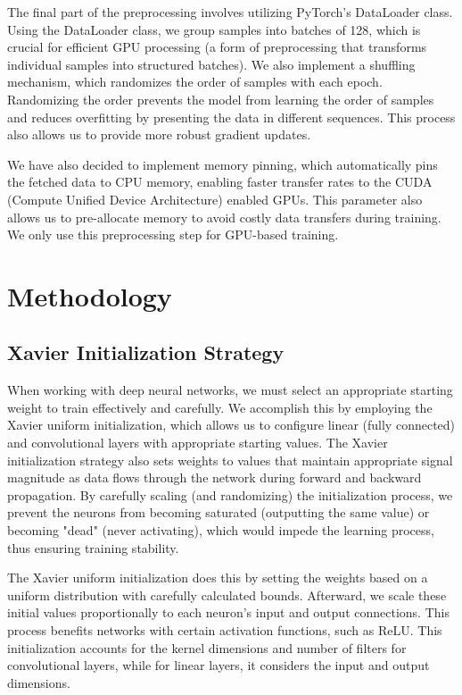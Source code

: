 \documentclass[12pt]{article}
\begin{document}
The final part of the preprocessing involves utilizing PyTorch's DataLoader class. Using the DataLoader class, we group samples into batches of 128, which is crucial for efficient GPU processing (a form of preprocessing that transforms individual samples into structured batches). We also implement a shuffling mechanism, which randomizes the order of samples with each epoch. Randomizing the order prevents the model from learning the order of samples and reduces overfitting by presenting the data in different sequences. This process also allows us to provide more robust gradient updates.

We have also decided to implement memory pinning, which automatically pins the fetched data to CPU memory, enabling faster transfer rates to the CUDA (Compute Unified Device Architecture) enabled GPUs. This parameter also allows us to pre-allocate memory to avoid costly data transfers during training. We only use this preprocessing step for GPU-based training.

\section*{Methodology}

\subsection*{Xavier Initialization Strategy}

When working with deep neural networks, we must select an appropriate starting weight to train effectively and carefully. We accomplish this by employing the Xavier uniform initialization, which allows us to configure linear (fully connected) and convolutional layers with appropriate starting values. The Xavier initialization strategy also sets weights to values that maintain appropriate signal magnitude as data flows through the network during forward and backward propagation. By carefully scaling (and randomizing) the initialization process, we prevent the neurons from becoming saturated (outputting the same value) or becoming "dead" (never activating), which would impede the learning process, thus ensuring training stability.

The Xavier uniform initialization does this by setting the weights based on a uniform distribution with carefully calculated bounds. Afterward, we scale these initial values proportionally to each neuron's input and output connections. This process benefits networks with certain activation functions, such as ReLU. This initialization accounts for the kernel dimensions and number of filters for convolutional layers, while for linear layers, it considers the input and output dimensions.
\end{document}
